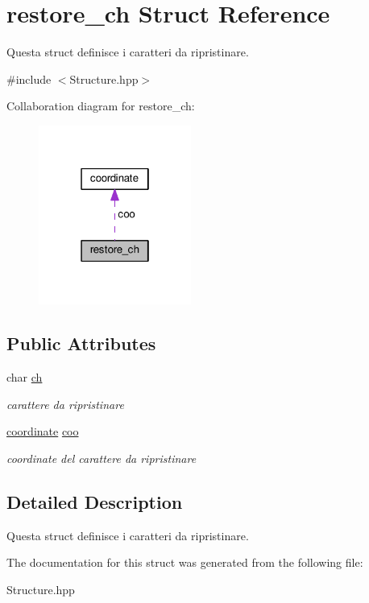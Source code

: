\hypertarget{structrestore__ch}{}\section{restore\+\_\+ch Struct Reference}
\label{structrestore__ch}


Questa struct definisce i caratteri da ripristinare.  




{\ttfamily \#include $<$Structure.\+hpp$>$}



Collaboration diagram for restore\+\_\+ch\+:\nopagebreak
\begin{figure}[H]
\begin{center}
\leavevmode
\includegraphics[width=142pt]{structrestore__ch__coll__graph}
\end{center}
\end{figure}
\subsection*{Public Attributes}
\begin{DoxyCompactItemize}
\item 
\hypertarget{structrestore__ch_a25af9707740fb5a85efc89cd95f66698}{}char \hyperlink{structrestore__ch_a25af9707740fb5a85efc89cd95f66698}{ch}\label{structrestore__ch_a25af9707740fb5a85efc89cd95f66698}

\begin{DoxyCompactList}\small\item\em carattere da ripristinare \end{DoxyCompactList}\item 
\hypertarget{structrestore__ch_a7e132144db0a22ede1a5c2d1c5b133ec}{}\hyperlink{structcoordinate}{coordinate} \hyperlink{structrestore__ch_a7e132144db0a22ede1a5c2d1c5b133ec}{coo}\label{structrestore__ch_a7e132144db0a22ede1a5c2d1c5b133ec}

\begin{DoxyCompactList}\small\item\em coordinate del carattere da ripristinare \end{DoxyCompactList}\end{DoxyCompactItemize}


\subsection{Detailed Description}
Questa struct definisce i caratteri da ripristinare. 

The documentation for this struct was generated from the following file\+:\begin{DoxyCompactItemize}
\item 
Structure.\+hpp\end{DoxyCompactItemize}
